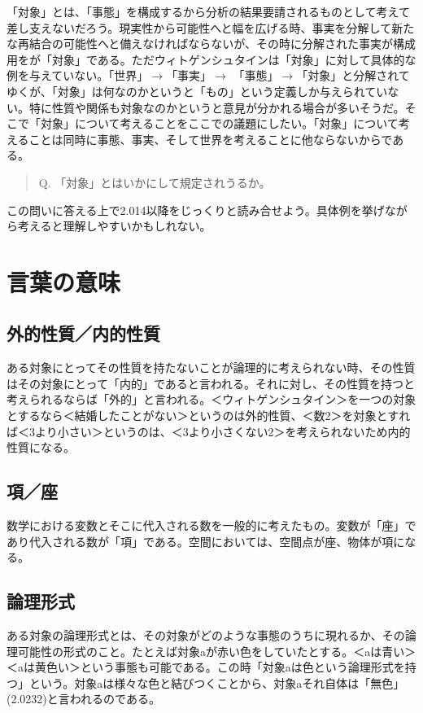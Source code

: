 \documentclass[a4paper,11pt]{jsarticle}
\begin{document}
「対象」とは、「事態」を構成するから分析の結果要請されるものとして考えて差し支えないだろう。現実性から可能性へと幅を広げる時、事実を分解して新たな再結合の可能性へと備えなければならないが、その時に分解された事実が構成用をが「対象」である。ただウィトゲンシュタインは「対象」に対して具体的な例を与えていない。「世界」$\rightarrow$「事実」$\rightarrow$ 「事態」$\rightarrow$「対象」と分解されてゆくが、「対象」は何なのかというと「もの」という定義しか与えられていない。特に性質や関係も対象なのかというと意見が分かれる場合が多いそうだ。そこで「対象」について考えることをここでの議題にしたい。「対象」について考えることは同時に事態、事実、そして世界を考えることに他ならないからである。
\begin{quote}
Q. 「対象」とはいかにして規定されうるか。
\end{quote}
この問いに答える上で2.014以降をじっくりと読み合せよう。具体例を挙げながら考えると理解しやすいかもしれない。

\section{言葉の意味}
\subsection{外的性質／内的性質}
ある対象にとってその性質を持たないことが論理的に考えられない時、その性質はその対象にとって「内的」であると言われる。それに対し、その性質を持つと考えられるならば「外的」と言われる。＜ウィトゲンシュタイン＞を一つの対象とするなら＜結婚したことがない＞というのは外的性質、＜数2＞を対象とすれば＜3より小さい＞というのは、＜3より小さくない2＞を考えられないため内的性質になる。

\subsection{項／座}
数学における変数とそこに代入される数を一般的に考えたもの。変数が「座」であり代入される数が「項」である。空間においては、空間点が座、物体が項になる。

\subsection{論理形式}
ある対象の論理形式とは、その対象がどのような事態のうちに現れるか、その論理可能性の形式のこと。たとえば対象aが赤い色をしていたとする。＜aは青い＞＜aは黄色い＞という事態も可能である。この時「対象aは色という論理形式を持つ」という。対象aは様々な色と結びつくことから、対象aそれ自体は「無色」(2.0232)と言われるのである。
\end{document}
